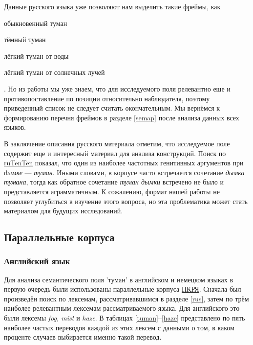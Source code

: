 \par Данные русского языка уже позволяют нам выделить такие фреймы, как \begin{enumerate*}
\item обыкновенный туман
\item тёмный туман
\item лёгкий туман от воды
\item лёгкий туман от солнечных лучей
\end{enumerate*}. Но из работы \citep{соколовский2017} мы уже знаем, что для исследуемого поля релевантно еще и противопоставление по позиции относительно наблюдателя, поэтому приведенный список не следует считать окончательным. Мы вернёмся к формированию перечня фреймов в разделе \ref{semap} после анализа данных всех языков.

В заключение описания русского материала отметим, что исследуемое поле  содержит еще и интересный материал для анализа конструкций. Поиск по  \hyperlink{tenten}{ruTenTen} показал, что один из наиболее частотных генитивных аргументов при \textit{дымке} --- \textit{туман}. Иными словами, в корпусе часто встречается сочетание \textit{дымка тумана}, тогда как обратное сочетание \textit{туман дымки} встречено не было и представляется аграмматичным. К сожалению, формат нашей работы не позволяет углубиться в изучение этого вопроса, но эта проблематика может стать материалом для будущих исследований.

\subsection{Параллельные корпуса}

\subsubsection{Английский язык}

\par Для анализа семантического поля 'туман' в английском и немецком языках в первую очередь были использованы параллельные корпуса \hyperlink{ruscorpora}{НКРЯ}. Сначала был произведён поиск по лексемам, рассматривавшимся в разделе \ref{rus}, затем по трём наиболее релевантным лексемам рассматриваемого языка. Для английского это были лексемы \textit{fog, mist} и \textit{haze}. В таблицах \ref{tuman}--\ref{haze} представлено по пять наиболее частых переводов каждой из этих лексем с данными о том, в каком проценте случаев выбирается именно такой перевод.

